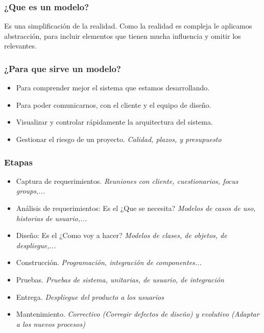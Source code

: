 \documentclass[titlepage,a4paper]{article}
\begin{document}
\subsubsection*{¿Que es un modelo?}
Es una simplificación de la realidad. Como la realidad es compleja le aplicamos abstracción, para incluir elementos que tienen mucha influencia y omitir los relevantes.

\subsubsection*{¿Para que sirve un modelo?}
    \begin{itemize}
        \item Para comprender mejor el sistema que estamos desarrollando.
        \item Para poder comunicarnos, con el cliente y el equipo de diseño.
        \item Visualizar y controlar rápidamente la arquitectura del sistema.
        \item Gestionar el riesgo de un proyecto. \textit{Calidad, plazos, y presupuesto}
    \end{itemize}

\subsubsection*{Etapas}
    \begin{itemize}
        \item Captura de requerimientos. \textit{Reuniones con cliente, cuestionarios, focus groups,...}
        \item Análisis de requerimientos: Es el ¿Que se necesita? \textit{Modelos de casos de uso, historias de usuario,...}
        \item Diseño: Es el ¿Como voy a hacer? \textit{Modelos de clases, de objetos, de despliegue,...}
        \item Construcción. \textit{Programación, integración de componentes...}
        \item Pruebas. \textit{Pruebas de sistema, unitarias, de usuario, de integración}
        \item Entrega. \textit{Despliegue del producto a los usuarios}
        \item Mantenimiento. \textit{Correctivo (Corregir defectos de diseño) y evolutivo (Adaptar a los nuevos procesos)}
    \end{itemize}
\end{document}
